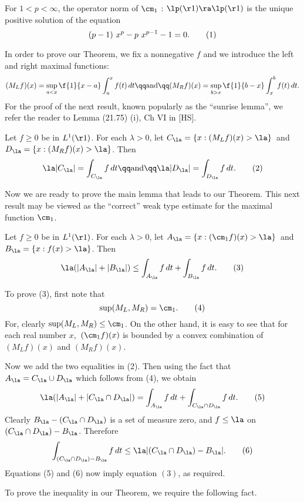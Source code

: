 For $1<p<\infty$, the operator norm of
$\cm_1$ : $\lp(\r1) \ra \lp(\r1)$ is the
unique positive solution of the   equation
$$
(p-1) \ x^p - p \ x^{p-1} -1 =0.\tag1
$$
\endproclaim



\bigskip

In order to prove our Theorem, we fix a nonnegative $f$ and we
introduce the left and
right maximal functions:
$$
(M_Lf)(x)= \sup_{a<x}\f{1}{x-a}\int_a^x f(t)\, dt \qq\text{and}\qq
(M_Rf)(x)= \sup_{b>x}\f{1}{b-x}\int_x^b f(t)\, dt.
$$
For the proof of the next result, known popularly as
the ``sunrise lemma'', we refer the reader to
Lemma (21.75) (i), Ch  VI in [HS].

  Let $f\ge 0$ be in $L^1(\r1)$.  For each $\lambda > 0$, let
$C_\la  =\{x: (M_Lf)(x)>\la \}$\ and
$D_\la =\{x: (M_Rf)(x)>\la \}$.  Then
$$ \la |C_\la| = \int_{C_\la} f\, dt   \qq\text{and}\qq
   \la |D_\la| = \int_{D_\la} f\, dt. \tag2
$$
\endproclaim

\medskip

Now we are ready to prove the main lemma that leads to our Theorem.
This next result may be viewed as the ``correct'' weak type estimate
for the maximal function $\cm_1$.

  Let  $f\ge 0$ be in  $L^1(\r1)$.  For each $\lambda > 0$,
let
$A_\la =\{x: (\cm_1f)(x)>\la \}$\ and
$B_\la =\{x: f(x)>\la \}$.
Then
$$
\la (|A_\la|+|B_\la|) \le \int_{A_\la}f \, dt+\int_{B_\la}f \, dt.\tag3
$$
\endproclaim

\noindent
To prove (3), first note that
$$
\sup (M_L,M_R)= \cm_1.\tag4
$$
For,
clearly $\sup (M_L,M_R)\le \cm_1$. On the other hand, it
is easy to see that for each real number $x$,\
$(\cm_1f)(x)$ is bounded by a convex combination of $(M_Lf)(x)$
and $(M_Rf)(x)$.

Now we add the two equalities in (2). Then using the fact that
$A_\la = C_\la \cup D_\la$ which follows from (4),  we obtain
$$
\la (|A_\la|+|C_\la \cap D_\la|) = \int_{A_\la}f\, dt +\int_{C_\la \cap
D_\la}f \, dt.\tag5
$$
Clearly $B_\la - (C_\la \cap D_\la)$
is a set of measure zero, and $f \le \la$ on
$(C_\la \cap D_\la)-B_\la$.  Therefore
$$
\int_{(C_\la \cap D_\la)-B_\la}f \, dt\le \la |(C_\la \cap D_\la)-B_\la|.
\tag6
$$
Equations (5) and (6) now imply equation $(3)$,
as required.

\bigskip

To prove the inequality in our Theorem, we require
the following fact.

